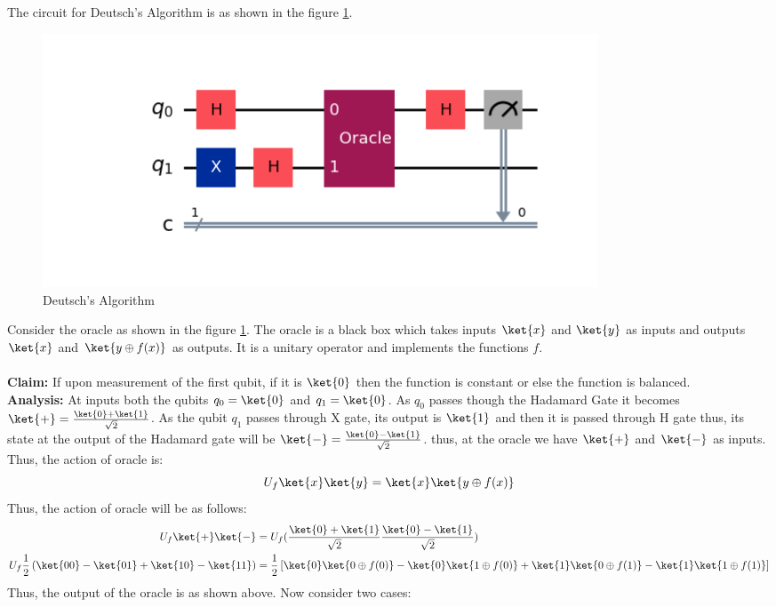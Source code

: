 \documentclass[12pt, oneside]{book}
\theoremstyle{definition}
\theoremstyle{definition}
\theoremstyle{remark}
\begin{document}
The circuit for Deutsch's Algorithm is as shown in the figure \ref{fig:deutsch}.
\begin{figure}[H]
    \centering
    \includegraphics[width=0.8\textwidth]{../images/deutsch.png}
    \caption{Deutsch's Algorithm}
    \label{fig:deutsch}
\end{figure}
Consider the oracle as shown in the figure \ref{fig:deutsch}. The oracle is a black box which takes inputs $\ket{x}$ and $\ket{y}$ as inputs 
and outputs $\ket{x}$ and $\ket{y\oplus f(x)}$ as outputs. It is a unitary operator and implements the functions $f$.\\
\\
\textbf{Claim: }If upon measurement of the first qubit, if it is $\ket{0}$ then the function is constant or else the function is balanced.
\\
\textbf{Analysis: }At inputs both the qubits $q_0=\ket{0}$ and $q_1=\ket{0}$. As $q_0$ passes though the Hadamard Gate it becomes $\ket{+}=\frac{\ket{0}+\ket{1}}{\sqrt{2}}$.
As the qubit $q_1$ passes through X gate, its output is $\ket{1}$ and then it is passed through H gate thus, its state at the output of the Hadamard gate will be $\ket{-}= \frac{\ket{0}-\ket{1}}{\sqrt{2}}$.
thus, at the oracle we have $\ket{+}$ and $\ket{-}$ as inputs. Thus, the action of oracle is:
\[
    U_f\ket{x}\ket{y}=\ket{x}\ket{y\oplus f(x)}
\]
Thus, the action of oracle will be as follows:
\begin{align*}
    U_f\ket{+}\ket{-}&=U_f(\frac{\ket{0}+\ket{1}}{\sqrt{2}}\frac{\ket{0}-\ket{1}}{\sqrt{2}})\\
    U_f\frac{1}{2}\left(\ket{00}-\ket{01}+\ket{10}-\ket{11}\right)&=\frac{1}{2}\left[\ket{0}\ket{0\oplus f(0)}-\ket{0}\ket{1\oplus f(0)}+\ket{1}\ket{0\oplus f(1)}-\ket{1}\ket{1\oplus f(1)}\right]
\end{align*}
Thus, the output of the oracle is as shown above.
Now consider two cases:
\end{document}
